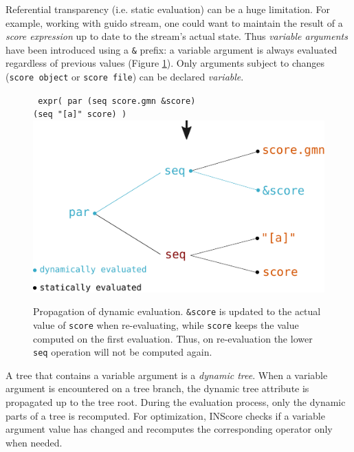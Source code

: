 \documentclass{article}
\newcommand{\OSC}[1]{\texttt{#1}}
\newcommand{\oper}[1]{\textcolor{figRed}{#1}}
\newcommand{\param}[1]{\textcolor{figOrange}{#1}}
\newcommand{\prefix}[1]{\textcolor{figBlue}{#1}}
\newcommand{\tab}{\hspace*{4mm}}
\begin{document}
Referential transparency (i.e. static evaluation) can be a huge limitation. For example, working with guido stream, one could want to maintain the result of a \emph{score expression} up to date to the stream's actual state.
Thus \emph{variable arguments} have been introduced using a \OSC{\&} prefix: a variable argument is always evaluated regardless of previous values (Figure \ref{fig:dynamicEval}). Only arguments subject to changes (\OSC{score object} or \OSC{score file}) can be declared \emph{variable}.

\begin{figure}[th]
\centering
\OSC{ expr( \oper{par} (\oper{seq} \param{score.gmn} \prefix{\&}\param{score}) \\
 \tab\tab\tab\tab (\oper{seq} \param{"[a]" score}) )}
\includegraphics[width=0.9\columnwidth]{imgs/dynamicEval}
\caption{Propagation of dynamic evaluation. \OSC{\prefix{\&}\param{score}} is updated to the actual value of \OSC{score} when re-evaluating, while \OSC{\param{score}} keeps the value computed on the first evaluation. Thus, on re-evaluation the lower \OSC{\oper{seq}} operation will not be computed again. 
\label{fig:dynamicEval}}
\end{figure}

A tree that contains a variable argument is a \emph{dynamic tree}. When a variable argument is encountered on a tree branch, the dynamic tree attribute is propagated up to the tree root. During the evaluation process, only the dynamic parts of a tree is recomputed. For optimization, INScore checks if a variable argument value has changed and recomputes the corresponding operator only when needed.

\end{document}
